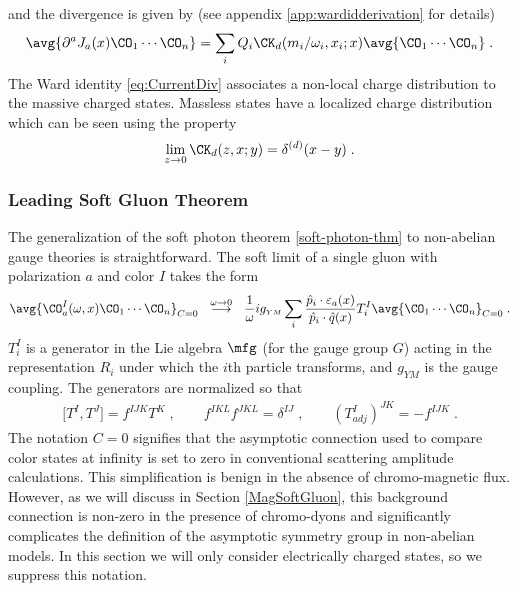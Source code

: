 \documentclass[11pt]{article}
\def\d{{\delta}}
\def\o{{\omega}}
\def\ve{{\varepsilon}}
\def\p{{\partial}}
\def\ym{{\scriptscriptstyle YM}}
\begin{document}
and the divergence is given by (see appendix \ref{app:wardidderivation} for details)
\begin{equation}
\begin{split}
\label{eq:CurrentDiv}
\avg{ \p^a J_a(x) \CO_1 \cdots \CO_n  } =  \sum_i Q_i \CK_d(   m_i / \o_i , x_i ; x  )  \avg{  \CO_1 \cdots \CO_n } \;  .
\end{split}
\end{equation}
The Ward identity \eqref{eq:CurrentDiv} associates a non-local charge distribution to the massive charged states. Massless states have a localized charge distribution which can be seen using the property
\begin{equation}
\begin{split}\label{Kprop}
\lim_{z \to 0} \CK_d ( z , x ;  y  )  = \d^{(d)}(x-y) \; .
\end{split}
\end{equation}



\subsubsection*{Leading Soft Gluon Theorem}

The generalization of the soft photon theorem \eqref{soft-photon-thm} to non-abelian gauge theories is straightforward. The soft limit of a single gluon with polarization $a$ and color $I$ takes the form
\begin{equation}
\begin{split}\label{soft-gluon-thm}
\avg{ \CO^I_a ( \o , x ) \CO_1 \cdots \CO_n }_{C=0}  ~~ \stackrel{\o\to0}{\longrightarrow} ~~ \frac{1}{\o}  i g_\ym  \sum_i \frac{ {\hat p}_i \cdot \ve_a(x) }{ {\hat p}_i \cdot {\hat q}(x)  } T^I_i \avg{ \CO_1 \cdots \CO_n }_{C=0}  \; . 
\end{split}
\end{equation}
$T^I_i$ is a generator in the Lie algebra $\mfg$ (for the gauge group $G$) acting in the representation $R_i$ under which the $i$th particle transforms, and $g_{\ym}$ is the gauge coupling. The generators are normalized so that
\begin{equation}
\begin{split}
\big[ T^I , T^J \big] = f^{IJK} T^K \; , \qquad f^{IKL} f^{JKL} = \d^{IJ} \; , \qquad (T_{adj}^I)^{JK} = - f^{IJK}\; . 
\end{split}
\end{equation}
The notation $C=0$ signifies that the asymptotic connection used to compare color states at infinity is set to zero in conventional scattering amplitude calculations. This simplification is benign in the absence of chromo-magnetic flux. However, as we will discuss in Section \ref{MagSoftGluon}, this background connection is non-zero in the presence of chromo-dyons and significantly complicates the definition of the asymptotic symmetry group in non-abelian models. In this section we will only consider electrically charged states, so we suppress this notation. 
\end{document}
